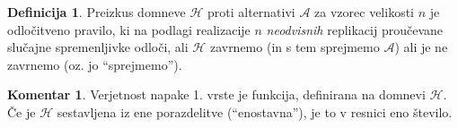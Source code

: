 \documentclass[11pt]{article}
\newcommand{\1}{\mathbbm{1}}
\newcommand{\h}{\mathcal{H}}
\newcommand{\A}{\mathcal{A}}
\theoremstyle{definition}
\newtheorem{definicija}{Definicija}[section]
\theoremstyle{definition}
\theoremstyle{definition}
\newtheorem*{komentar}{Komentar}
\begin{document}
\begin{definicija}

Preizkus domneve $\h$ proti alternativi $\A$ za vzorec velikosti $n$ je odločitveno pravilo, ki na podlagi realizacije $n$ \textit{neodvisnih} replikacij proučevane slučajne spremenljivke odloči, ali $\h$ zavrnemo (in s tem sprejmemo $\A$) ali je ne zavrnemo (oz. jo ``sprejmemo'').

\end{definicija}
\vspace{0.5cm}

\begin{komentar}

Verjetnost napake 1. vrste je funkcija, definirana na domnevi $\h$. Če je $\h$ sestavljena iz ene porazdelitve (``enostavna''), je to v resnici eno število.

\end{komentar}
\vspace{0.5cm}

\end{document}
